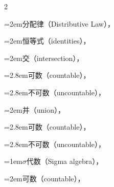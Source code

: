 \begin{multicols}{2}
\par\noindent\hangindent=2em\hspace*{1em}\label{idx:964}分配律（Distributive Law），\hyperref[thm:1.1.4]{\pageref*{thm:1.1.4}}\par
\par\noindent\hangindent=2em\hspace*{1em}\label{idx:965}恒等式（identities），\hyperref[exercise:1.2]{\pageref*{exercise:1.2}}\par
\par\noindent\hangindent=2em\hspace*{1em}\label{idx:966}交（intersection），\hyperref[idxocc:966:33]{\pageref*{idxocc:966:33}}\par
\par\noindent\hangindent=2.8em\hspace*{1.8em}\label{idx:967}可数（countable），\hyperref[idxocc:967:34]{\pageref*{idxocc:967:34}}\par
\par\noindent\hangindent=2.8em\hspace*{1.8em}\label{idx:968}不可数（uncountable），\hyperref[idxocc:968:35]{\pageref*{idxocc:968:35}}\par
\par\noindent\hangindent=2em\hspace*{1em}\label{idx:969}并（union），\hyperref[idxocc:969:33]{\pageref*{idxocc:969:33}}\par
\par\noindent\hangindent=2.8em\hspace*{1.8em}\label{idx:970}可数（countable），\hyperref[idxocc:970:34]{\pageref*{idxocc:970:34}}\par
\par\noindent\hangindent=2.8em\hspace*{1.8em}\label{idx:971}不可数（uncountable），\hyperref[idxocc:971:35]{\pageref*{idxocc:971:35}}\par
\par\addvspace{2pt}
\par\noindent\hangindent=1em\hspace*{0em}\label{idx:972}\ensuremath{\sigma}代数（Sigma algebra），\hyperref[def:1.2.1]{\pageref*{def:1.2.1}}\par
\par\noindent\hangindent=2em\hspace*{1em}\label{idx:973}可数（countable），\hyperref[ex:1.2.2]{\pageref*{ex:1.2.2}}\par

\end{multicols}
